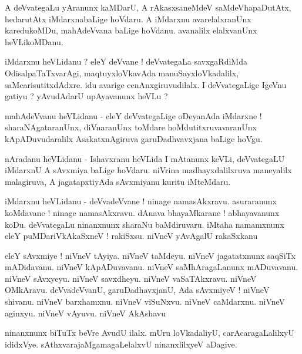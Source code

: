 \documentclass{article}
\begin{document}
\begin{mn}%
A deVvategaLu yAranunx kaMDarU, A rAkasxsaneMdeV saMdeVhapaDutAtx, hedarutAtx iMdarxnabaLige 
hoVdaru. A iMdarxnu avarelalxranUnx karedukoMDu, mahAdeVvana baLige hoVdanu. avanalilx elalxvanUnx 
heVLikoMDanu.
\end{mn}

\begin{mn}%
iMdarxnu heVLidanu ? eleY deVvane ! deVvategaLa savxgaRdiMda OdisalpaTaTxvarAgi, maqtuyxloVkavAda 
manuSayxloVkadalilx, saMcarisutitxdAdxre. idu avarige cenAnxgiruvudilalx. I deVvategaLige IgeVnu 
gatiyu ? yAvudAdarU upAyavanunx heVLu ?
\end{mn}

\begin{mn}%
mahAdeVvanu heVLidanu - eleY deVvategaLige oDeyanAda iMdarxne ! sharaNAgataranUnx, diVnaranUnx 
toMdare hoMdutitxruvavaranUnx kApADuvudaralilx AsakatxnAgiruva garuDadhvavxjana baLige hoVgu.
\end{mn}

\begin{mn}%
nAradanu heVLidanu - Ishavxranu heVLida I mAtanunx keVLi, deVvategaLU iMdarxnU A sAvxmiya baLige 
hoVdaru. niVrina madhayxdalilxruva maneyalilx malagiruva, A jagatapxtiyAda sAvxmiyanu kuritu 
iMteMdaru.
\end{mn}

\begin{mn}%
iMdarxnu heVLidanu - deVvadeVvane ! ninage namasAkxravu. asuraranunx koMdavane ! ninage 
namasAkxravu. dAnava bhayaMkarane ! abhayavanunx koDu. deVvategaLu ninanxnunx sharaNu baMdiruvaru. 
iMtaha namamxnunx eleY puMDariVkAkaSxneV ! rakiSxsu. niVneV yAvAgalU rakaSxkanu
\end{mn}

\begin{mn}%
eleY sAvxmiye ! niVneV tAyiya. niVneV taMdeyu. niVneV jagatatxnunx saqSiTx mADidavanu. niVneV 
kApADuvavanu. niVneV saMhAragaLanunx mADuvavanu. niVneV sAvxyeyu. niVneV savxdheyu. niVneV 
vaSaTAkxravu. niVneV OMkAravu. deVvadeVvanU, garuDadhavxjanU, Ada sAvxmiyeV ! niVneV shivanu. 
niVneV barxhamxnu. niVneV viSuNxvu. niVneV caMdarxnu. niVneV aginxyu. niVneV vAyuvu. niVneV AkAshavu
\end{mn}

\begin{mn}%
ninanxnunx biTuTx beVre AvudU ilalx. mUru loVkadaliyU, carAcaragaLalilxyU ididxVye. 
sAthxvarajaMgamagaLelalxvU ninanxlilxyeV aDagive.
\end{mn}
\end{document}
